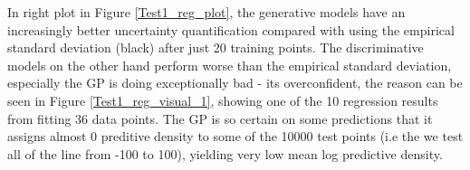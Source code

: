 In right plot in Figure \ref{Test1_reg_plot}, the generative models have an increasingly better
uncertainty quantification compared with using the empirical standard deviation (black) after just
20 training points.
The discriminative models on the other hand perform worse than the empirical standard deviation,
especially the GP is doing exceptionally bad - its overconfident, the reason can be seen in Figure
\ref{Test1_reg_visual_1}, showing one of the 10 regression results from fitting 36 data points. The
GP is so certain on some predictions that it assigns almost 0 preditive density to some of the 10000
test points (i.e the we test all of the line from -100 to 100), yielding very low mean log
predictive density. 
